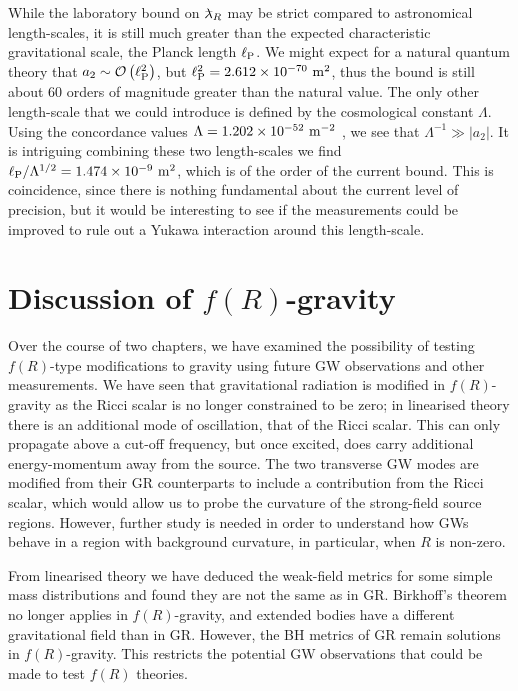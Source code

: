 While the laboratory bound on $\lambdabar_R$ may be strict compared to astronomical length-scales, it is still much greater than the expected characteristic gravitational scale, the Planck length $\ell_\mathrm{P}$. We might expect for a natural quantum theory that $a_2 \sim \mathcal{O}\left({\ell_\mathrm{P}^2}\right)$, but $\ell_\mathrm{P}^2 = 2.612 \times 10^{-70}~\mathrm{m^2}$, thus the bound is still about $60$ orders of magnitude greater than the natural value. The only other length-scale that we could introduce is defined by the cosmological constant $\Lambda$. Using the concordance values $\Lambda = 1.202 \times 10^{-52}~\mathrm{m^{-2}}$ \citep{Bennett2012, Hinshaw2012}, we see that $\Lambda^{-1} \gg |a_2|$. It is intriguing combining these two length-scales we find ${\ell_\mathrm{P}}/{\Lambda^{1/2}} = 1.474 \times 10^{-9}~\mathrm{m^2}$, which is of the order of the current bound. This is coincidence, since there is nothing fundamental about the current level of precision, but it would be interesting to see if the measurements could be improved to rule out a Yukawa interaction around this length-scale.

\section{Discussion of $f(R)$-gravity\label{sec:f_Discuss}}

Over the course of two chapters, we have examined the possibility of testing $f(R)$-type modifications to gravity using future GW observations and other measurements. We have seen that gravitational radiation is modified in $f(R)$-gravity as the Ricci scalar is no longer constrained to be zero; in linearised theory there is an additional mode of oscillation, that of the Ricci scalar. This can only propagate above a cut-off frequency, but once excited, does carry additional energy-momentum away from the source. The two transverse GW modes are modified from their GR counterparts to include a contribution from the Ricci scalar, which would allow us to probe the curvature of the strong-field source regions. However, further study is needed in order to understand how GWs behave in a region with background curvature, in particular, when $R$ is non-zero.

From linearised theory we have deduced the weak-field metrics for some simple mass distributions and found they are not the same as in GR. Birkhoff's theorem no longer applies in $f(R)$-gravity, and extended bodies have a different gravitational field than in GR. However, the BH metrics of GR remain solutions in $f(R)$-gravity. This restricts the potential GW observations that could be made to test $f(R)$ theories.

